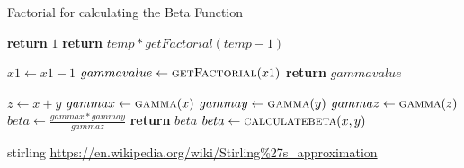 \documentclass{report}
\begin{document}
\begin{algorithm}
\caption{Factorial for calculating the Beta Function}
\begin{algorithmic}[1]

   
    \State \textbf{return} $1$
    \Else
    \State \textbf{return} $temp * getFactorial(temp - 1)$
    \EndIf
    \EndProcedure
\Statex


    \State $x1 \leftarrow x1-1$
    \State $gammavalue \leftarrow \Call{getFactorial}{x1}$
    \State \textbf{return} $gammavalue$
    \EndProcedure
\Statex

    \State $z \leftarrow x+y$
    \State $gammax \leftarrow \Call{gamma}{x}$
    \State $gammay \leftarrow \Call{gamma}{y}$
    \State $gammaz \leftarrow \Call{gamma}{z}$
    \State $beta \leftarrow \frac{gammax * gammay}{gammaz}$
    \State \textbf{return} $beta$
    \EndProcedure
\Statex
\State $beta \leftarrow \Call{calculatebeta}{x,y} $
\end{algorithmic}
\end{algorithm}

\begin{thebibliography}{9}
\item{stirling}
\url{https://en.wikipedia.org/wiki/Stirling%27s_approximation}

\end{thebibliography}
\end{document}

